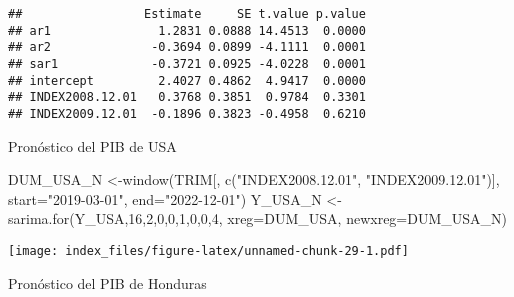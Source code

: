 \documentclass[
]{book}
\newenvironment{Shaded}{\begin{snugshade}}{\end{snugshade}}
\newcommand{\AttributeTok}[1]{\textcolor[rgb]{0.77,0.63,0.00}{#1}}
\newcommand{\DecValTok}[1]{\textcolor[rgb]{0.00,0.00,0.81}{#1}}
\newcommand{\FunctionTok}[1]{\textcolor[rgb]{0.00,0.00,0.00}{#1}}
\newcommand{\NormalTok}[1]{#1}
\newcommand{\OtherTok}[1]{\textcolor[rgb]{0.56,0.35,0.01}{#1}}
\newcommand{\StringTok}[1]{\textcolor[rgb]{0.31,0.60,0.02}{#1}}
\begin{document}
\begin{verbatim}
##                 Estimate     SE t.value p.value
## ar1               1.2831 0.0888 14.4513  0.0000
## ar2              -0.3694 0.0899 -4.1111  0.0001
## sar1             -0.3721 0.0925 -4.0228  0.0001
## intercept         2.4027 0.4862  4.9417  0.0000
## INDEX2008.12.01   0.3768 0.3851  0.9784  0.3301
## INDEX2009.12.01  -0.1896 0.3823 -0.4958  0.6210
\end{verbatim}

Pronóstico del PIB de USA

\begin{Shaded}
\begin{Highlighting}[]
\NormalTok{DUM\_USA\_N }\OtherTok{\textless{}{-}}\FunctionTok{window}\NormalTok{(TRIM[, }\FunctionTok{c}\NormalTok{(}\StringTok{"INDEX2008.12.01"}\NormalTok{, }\StringTok{"INDEX2009.12.01"}\NormalTok{)], }\AttributeTok{start=}\StringTok{"2019{-}03{-}01"}\NormalTok{, }\AttributeTok{end=}\StringTok{"2022{-}12{-}01"}\NormalTok{)}
\NormalTok{Y\_USA\_N   }\OtherTok{\textless{}{-}}\FunctionTok{sarima.for}\NormalTok{(Y\_USA,}\DecValTok{16}\NormalTok{,}\DecValTok{2}\NormalTok{,}\DecValTok{0}\NormalTok{,}\DecValTok{0}\NormalTok{,}\DecValTok{1}\NormalTok{,}\DecValTok{0}\NormalTok{,}\DecValTok{0}\NormalTok{,}\DecValTok{4}\NormalTok{, }\AttributeTok{xreg=}\NormalTok{DUM\_USA, }\AttributeTok{newxreg=}\NormalTok{DUM\_USA\_N) }
\end{Highlighting}
\end{Shaded}

\texttt{[image: index\_files/figure-latex/unnamed-chunk-29-1.pdf]}

Pronóstico del PIB de Honduras
\end{document}
